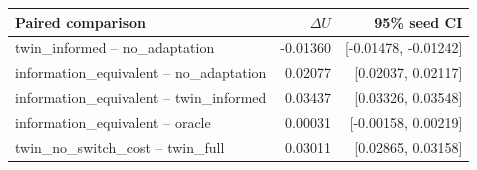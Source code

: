 \begin{tabular}{lrr}
\toprule
Paired comparison & $\Delta U$ & 95\% seed CI \\
\midrule
twin\_informed -- no\_adaptation & -0.01360 & [-0.01478, -0.01242] \\
information\_equivalent -- no\_adaptation & 0.02077 & [0.02037, 0.02117] \\
information\_equivalent -- twin\_informed & 0.03437 & [0.03326, 0.03548] \\
information\_equivalent -- oracle & 0.00031 & [-0.00158, 0.00219] \\
twin\_no\_switch\_cost -- twin\_full & 0.03011 & [0.02865, 0.03158] \\
\bottomrule
\end{tabular}
